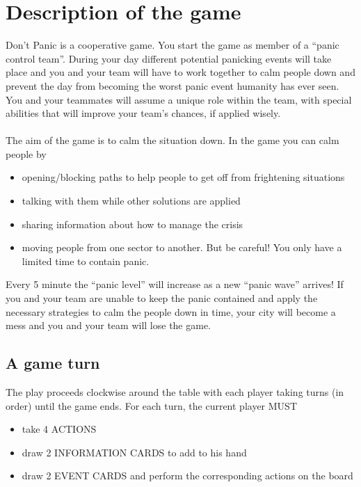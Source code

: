 \section*{Description of the game}
Don’t Panic is a cooperative game. You start the game as member of a “panic control team”. During your day different potential panicking events will take place and you and your team will have to work together to calm people down and prevent the day from becoming the worst panic event humanity has ever seen. You and your teammates will assume a unique role within the team, with special abilities that will improve your team’s chances, if applied wisely.\\
\\
The aim of the game is to calm the situation down. In the game you can calm people by
\begin{itemize}
	\item opening/blocking paths to help people to get off from frightening situations
	\item talking with them while other solutions are applied
	\item sharing information about how to manage the crisis
	\item moving people from one sector to another. But be careful! You only have a limited time to contain panic.
\end{itemize}
Every 5 minute the “panic level” will increase as a new “panic wave” arrives! If you and your team are unable to keep the panic contained and apply the necessary strategies to calm the people down in time, your city will become a mess and you and your team will lose the game.\\
%
%
\subsection*{A game turn}
The play proceeds clockwise around the table with each player taking turns (in order) until the game ends. For each turn, the current player MUST
\begin{itemize}
	\item take 	4 ACTIONS
	\item draw 	2 INFORMATION CARDS to add to his hand	
	\item draw 	2 EVENT CARDS and perform the corresponding actions on the board
\end{itemize}
%
%

